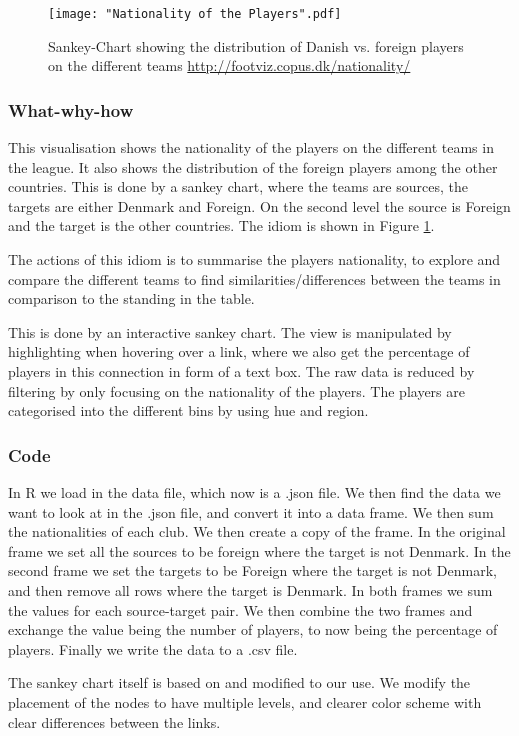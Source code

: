 \documentclass[Report.tex]{subfiles}
\begin{document}
\begin{figure}
\center
\texttt{[image: "Nationality of the Players".pdf]}
\caption{Sankey-Chart showing the distribution of Danish vs. foreign players on the different teams \url{http://footviz.copus.dk/nationality/}}
\label{Fig:Nationality}
\end{figure}


\subsubsection{What-why-how}

This visualisation shows the nationality of the players on the different teams in the league. It also shows the distribution of the foreign players among the other countries. This is done by a sankey chart, where the teams are sources, the targets are either Denmark and Foreign. On the second level the source is Foreign and the target is the other countries. The idiom is shown in Figure \ref{Fig:Nationality}.

The actions of this idiom is to summarise the players nationality, to explore and compare the different teams to find similarities/differences between the teams in comparison to the standing in the table. 

This is done by an interactive sankey chart. The view is manipulated by highlighting when hovering over a link, where we also get the percentage of players in this connection in form of a text box. The raw data is reduced by filtering by only focusing on the nationality of the players. The players are categorised into the different bins by using hue and region.

\subsubsection{Code}
In R we load in the data file, which now is a .json file. We then find the data we want to look at in the .json file, and convert it into a data frame. We then sum the nationalities of each club. We then create a copy of the frame. In the original frame we set all the sources to be foreign where the target is not Denmark. In the second frame we set the targets to be Foreign where the target is not Denmark, and then remove all rows where the target is Denmark. In both frames we sum the values for each source-target pair. We then combine the two frames and exchange the value being the number of players, to now being the percentage of players. Finally we write the data to a .csv file.

The sankey chart itself is based on \cite{Sankey} and modified to our use. We modify the placement of the nodes to have multiple levels, and clearer color scheme with clear differences between the links.
\end{document}
